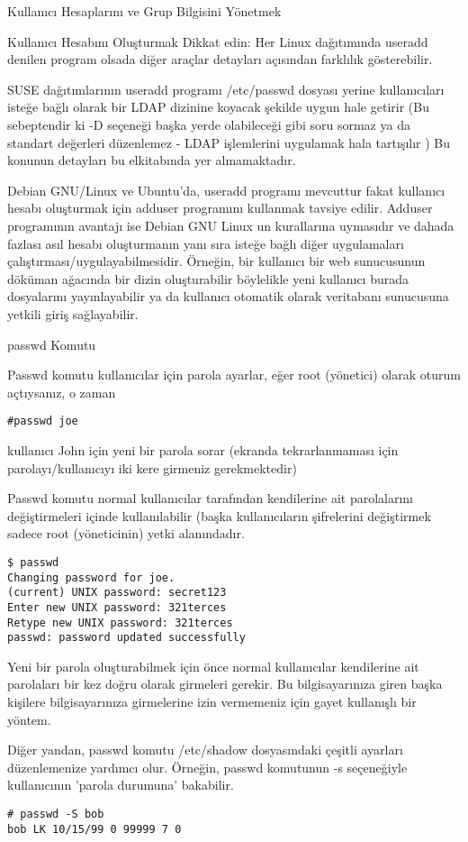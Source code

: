 \begin{section}{Kullanıcı Hesaplarını ve Grup Bilgisini Yönetmek}
\begin{subsection}{Kullanıcı Hesabını Oluşturmak}
Dikkat edin: Her Linux dağıtımında useradd denilen program olsada diğer araçlar detayları açısından farklılık gösterebilir.

SUSE dağıtımlarının useradd programı /etc/passwd dosyası yerine kullanıcıları isteğe bağlı olarak bir LDAP dizinine koyacak şekilde uygun hale getirir (Bu sebeptendir ki -D seçeneği başka yerde olabileceği gibi soru sormaz ya da standart değerleri düzenlemez - LDAP işlemlerini uygulamak hala tartışılır ) Bu konunun detayları bu elkitabında yer almamaktadır.

Debian GNU/Linux ve Ubuntu'da, useradd programı mevcuttur fakat kullanıcı hesabı oluşturmak için adduser programını kullanmak tavsiye edilir. Adduser programının avantajı ise Debian GNU Linux un kurallarına uymasıdır ve dahada fazlası asıl hesabı oluşturmanın yanı sıra isteğe bağlı diğer uygulamaları çalıştırması/uygulayabilmesidir. Örneğin, bir kullanıcı bir web sunucusunun döküman ağacında bir dizin oluşturabilir böylelikle yeni kullanıcı burada dosyalarını yayınlayabilir ya da kullanıcı otomatik olarak veritabanı sunucusuna yetkili giriş sağlayabilir.
\end{subsection}
\begin{subsection}{passwd Komutu}

Passwd komutu kullanıcılar için parola ayarlar, eğer root (yönetici) olarak oturum açtıysanız, o zaman
\begin{verbatim}
#passwd joe
\end{verbatim}

kullanıcı John için yeni bir parola sorar (ekranda tekrarlanmaması için parolayı/kullanıcıyı iki kere girmeniz gerekmektedir)

Passwd komutu normal kullanıcılar tarafından kendilerine ait parolalarını değiştirmeleri içinde kullanılabilir (başka kullanıcıların
şifrelerini değiştirmek sadece root (yöneticinin) yetki alanındadır.
\begin{verbatim}
$ passwd
Changing password for joe.
(current) UNIX password: secret123
Enter new UNIX password: 321terces
Retype new UNIX password: 321terces
passwd: password updated successfully
\end{verbatim}

Yeni bir parola oluşturabilmek için önce normal kullanıcılar kendilerine ait parolaları bir kez doğru olarak girmeleri gerekir. Bu bilgisayarınıza giren başka kişilere bilgisayarınıza girmelerine izin vermemeniz için gayet kullanışlı bir yöntem.

Diğer yandan, passwd komutu /etc/shadow dosyasındaki çeşitli ayarları düzenlemenize yardımcı olur. Örneğin, passwd komutunun -s seçeneğiyle kullanıcının
'parola durumuna' bakabilir.
\begin{verbatim}
# passwd -S bob
bob LK 10/15/99 0 99999 7 0
\end{verbatim}


\end{subsection}
\end{section}

